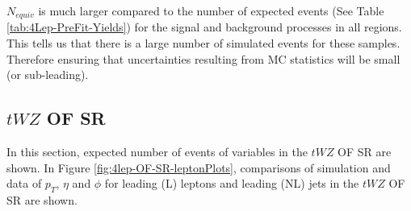 
$N_{equiv}$ is much larger compared to the number of expected events (See Table \ref{tab:4Lep-PreFit-Yields}) for the signal and background processes in all regions. This tells us that there is a large number of simulated events for these samples. Therefore ensuring that uncertainties resulting from MC statistics will be small (or sub-leading).

\subsection{$tWZ$ OF SR}
\label{sec:controlplotstetralepton-tWZ-OF-SR}


In this section, expected number of events of variables in the $tWZ$ OF SR are shown. In Figure \ref{fig:4lep-OF-SR-leptonPlots}, comparisons of simulation and data of $p_{T}$, $\eta$ and $\phi$ for leading (L) leptons and leading (NL) jets in the $tWZ$ OF SR are shown.

